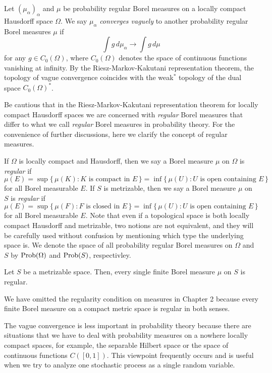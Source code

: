 \documentclass[a4paper]{article}
\begin{document}
\begin{defn}
Let $(\mu_\alpha)_\alpha$ and $\mu$ be probability regular Borel measures on a locally compact Hausdorff space $\Omega$.
We say $\mu_\alpha$ \emph{converges vaguely} to another probability regular Borel measures $\mu$ if
\[\int g\,d\mu_\alpha\to\int g\,d\mu\]
for any $g\in C_0(\Omega)$, where $C_0(\Omega)$ denotes the space of continuous functions vanishing at infinity.
By the Riesz-Markov-Kakutani representation theorem, the topology of vague convergence coincides with the weak$^*$ topology of the dual space $C_0(\Omega)^*$.
\end{defn}

Be cautious that in the Riesz-Markov-Kakutani representation theorem for locally compact Hausdorff spaces we are concerned with \emph{regular} Borel measures that differ to what we call \emph{regular} Borel measures in probability theory.
For the convenience of further discussions, here we clarify the concept of regular measures.

\begin{defn}
If $\Omega$ is locally compact and Hausdorff, then we say a Borel measure $\mu$ on $\Omega$ is \emph{regular} if
\[\mu(E)=\sup\{\,\mu(K):K\text{ is compact in }E\,\}
=\inf\{\,\mu(U):U\text{ is open containing }E\,\}\]
for all Borel measurable $E$.
If $S$ is metrizable, then we say a Borel measure $\mu$ on $S$ is \emph{regular} if
\[\mu(E)=\sup\{\,\mu(F):F\text{ is closed in }E\,\}
=\inf\{\,\mu(U):U\text{ is open containing }E\,\}\]
for all Borel measurable $E$.
Note that even if a topological space is both locally compact Hausdorff and metrizable, two notions are not equivalent, and they will be carefully used without confusion by mentioning which type the underlying space is.
We denote the space of all probability regular Borel measures on $\Omega$ and $S$ by $\operatorname{Prob}(\Omega)$ and $\operatorname{Prob}(S)$, respectivley.
\end{defn}

\begin{lem}
Let $S$ be a metrizable space.
Then, every single finite Borel measure $\mu$ on $S$ is regular.
\end{lem}

We have omitted the regularity condition on measures in Chapter 2 because every finite Borel measure on a compact metric space is regular in both senses.

The vague convergence is less important in probability theory because there are situations that we have to deal with probability measures on a nowhere locally compact spaces, for example, the separable Hilbert space or the space of continuous functions $C([0,1])$.
This viewpoint frequently occurs and is useful when we try to analyze one stochastic process as a single random variable.
\end{document}
